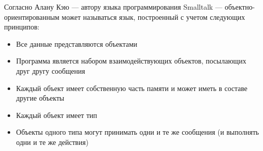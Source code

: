 Согласно Алану Кэю — автору языка программирования Smalltalk — объектно-ориентированным может называться язык, построенный с учетом следующих принципов:

\begin{itemize}
\item Все данные представляются объектами
\item Программа является набором взаимодействующих объектов, посылающих друг другу сообщения
\item Каждый объект имеет собственную часть памяти и может иметь в составе другие объекты
\item Каждый объект имеет тип
\item Объекты одного типа могут принимать одни и те же сообщения (и выполнять одни и те же действия)
\end{itemize}